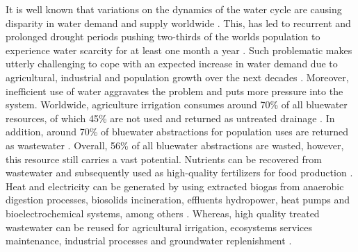 

It is well known that variations on the dynamics of the water cycle are causing disparity in water demand and supply worldwide \cite{FAO2015,unescoWastewaterUntappedResource2017}. This, has led to recurrent and prolonged drought periods pushing two-thirds of the worlds population to experience water scarcity for at least one month a year \cite{Mekonnene1500323}. Such problematic makes utterly challenging to cope with an expected increase in water demand due to agricultural, industrial and population growth over the next decades \cite{IFPRI2017}. Moreover, inefficient use of water aggravates the problem and puts more pressure into the system. Worldwide, agriculture irrigation consumes around 70\% of all bluewater resources, of which 45\% are not used and returned as untreated drainage \cite{unescoWastewaterUntappedResource2017}. In addition, around 70\% of bluewater abstractions for population uses are returned as wastewater \cite{unescoWastewaterUntappedResource2017}. Overall, 56\% of all bluewater abstractions are wasted, however, this resource still carries a vast potential. Nutrients can be recovered from wastewater and subsequently used as high-quality fertilizers for food production \cite{moEnergyNutrientsWater2013a}. Heat and electricity can be generated by using extracted biogas from anaerobic digestion processes, biosolids incineration, effluents hydropower, heat pumps and bioelectrochemical systems, among others \cite{moEnergyNutrientsWater2013a}. Whereas, high quality treated wastewater can be reused for agricultural irrigation, ecosystems services maintenance, industrial processes and groundwater replenishment \cite{moEnergyNutrientsWater2013a}.

